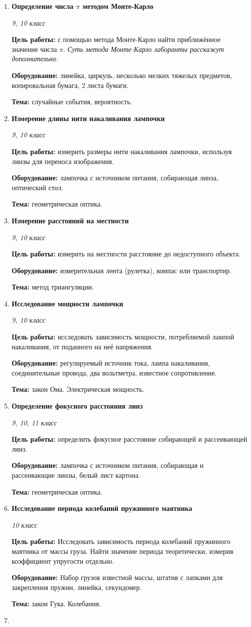 \documentclass[a4paper,10pt]{article}
\newcommand{\labtitle}[5]{
	\textbf{#2}\par
	\textit{#1 класс}\par
	\textbf{Цель работы:} #3\par
	\textbf{Оборудование:} #4\par
	\textbf{Тема:} #5
}
\begin{document}
\begin{enumerate}
	\item \labtitle
		{9, 10}
		{Определение числа $\pi$ методом Монте-Карло}
		{с помощью метода Монте-Карло найти приближённое значение числа $\pi$. \textit{Суть метода Монте-Карло лаборанты расскажут дополнительно.}}
		{линейка, циркуль, несколько мелких тяжелых предметов, копировальная бумага, 2 листа бумаги.}
		{случайные события, вероятность.}
	\item \labtitle
		{9, 10}
		{Измерение длины нити накаливания лампочки}
		{измерить размеры нити накаливания лампочки, используя линзы для переноса изображения.}
		{лампочка с источником питания, собирающая линза, оптический стол.}
		{геометрическая оптика.}
	\item \labtitle
		{9, 10}
		{Измерение расстояний на местности}
		{измерить на местности расстояние до недоступного объекта.}
		{измерительная лента (рулетка), компас или транспортир.}
		{метод триангуляции.}
	\item \labtitle
		{9, 10}
		{Исследование мощности лампочки}
		{исследовать зависимость мощности, потребляемой лампой накаливания, от поданного на неё напряжения.}
		{регулируемый источник тока, лампа накаливания, соединительные провода, два вольтметра, известное сопротивление.}
		{закон Ома. Электрическая мощность.}
	\item \labtitle
		{9, 10, 11}
		{Определение фокусного расстояния линз}
		{определить фокусное расстояние собирающей и рассеивающей линз.}
		{лампочка с источником питания, собирающая и рассеивающие линзы, белый лист картона.}
		{геометрическая оптика.}
	\item \labtitle
		{10}
		{Исследование периода колебаний пружинного маятника}
		{Исследовать зависимость периода колебаний пружинного маятника от массы груза. Найти значение периода теоретически, измерив коэффициент упругости отдельно.}
		{Набор грузов известной массы, штатив с лапками для закрепления пружин, линейка, секундомер.}
		{закон Гука. Колебания.}
	\item \labtitle

\end{enumerate}
\end{document}
